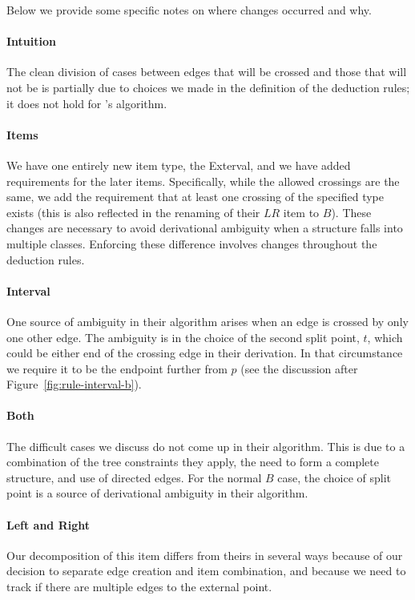 Below we provide some specific notes on where changes occurred and why.

\paragraph{Intuition}
The clean division of cases between edges that will be crossed and those that will not be is partially due to choices we made in the definition of the deduction rules; it does not hold for \textcite{ec}'s algorithm.

\paragraph{Items}
We have one entirely new item type, the Exterval, and we have added requirements for the later items.
Specifically, while the allowed crossings are the same, we add the requirement that at least one crossing of the specified type exists (this is also reflected in the renaming of their $LR$ item to $B$).
These changes are necessary to avoid derivational ambiguity when a structure falls into multiple classes.
Enforcing these difference involves changes throughout the deduction rules.

\paragraph{Interval}
One source of ambiguity in their algorithm arises when an edge is crossed by only one other edge.
The ambiguity is in the choice of the second split point, $t$, which could be either end of the crossing edge in their derivation.
In that circumstance we require it to be the endpoint further from $p$ (see the discussion after Figure~\ref{fig:rule-interval-b}).

\paragraph{Both}
The difficult cases we discuss do not come up in their algorithm.
This is due to a combination of the tree constraints they apply, the need to form a complete structure, and use of directed edges.
For the normal $B$ case, the choice of split point is a source of derivational ambiguity in their algorithm.

\paragraph{Left and Right}
Our decomposition of this item differs from theirs in several ways because of our decision to separate edge creation and item combination, and because we need to track if there are multiple edges to the external point.

